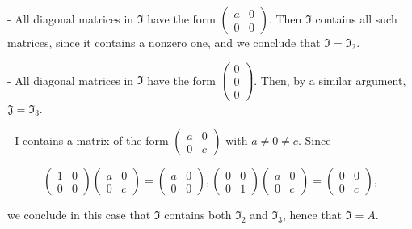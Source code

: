 \documentclass[10pt]{article}
\begin{document}
- All diagonal matrices in $\mathfrak{I}$ have the form $\left(\begin{array}{ll}a & 0 \\ 0 & 0\end{array}\right)$. Then $\mathfrak{I}$ contains all such matrices, since it contains a nonzero one, and we conclude that $\mathfrak{I}=\mathfrak{I}_{2}$.

- All diagonal matrices in $\mathfrak{I}$ have the form $\left(\begin{array}{l}0 \\ 0 \\ 0\end{array}\right)$. Then, by a similar argument, $\mathfrak{J}=\mathfrak{I}_{3}$.

- I contains a matrix of the form $\left(\begin{array}{ll}a & 0 \\ 0 & c\end{array}\right)$ with $a \neq 0 \neq c$. Since

$$
\left(\begin{array}{ll}
1 & 0 \\
0 & 0
\end{array}\right)\left(\begin{array}{ll}
a & 0 \\
0 & c
\end{array}\right)=\left(\begin{array}{ll}
a & 0 \\
0 & 0
\end{array}\right),\left(\begin{array}{ll}
0 & 0 \\
0 & 1
\end{array}\right)\left(\begin{array}{ll}
a & 0 \\
0 & c
\end{array}\right)=\left(\begin{array}{ll}
0 & 0 \\
0 & c
\end{array}\right),
$$

we conclude in this case that $\mathfrak{I}$ contains both $\mathfrak{I}_{2}$ and $\mathfrak{I}_{3}$, hence that $\mathfrak{I}=A$.
\end{document}
